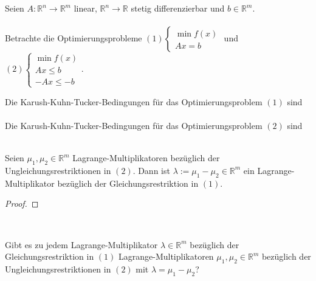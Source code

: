 Seien $A: \mathbb R^n\to \mathbb R^m$ linear, $\mathbb R^n\to \mathbb R$ stetig differenzierbar und $b\in\mathbb R^m$.\\\\
Betrachte die Optimierungsprobleme $(1)\begin{cases}\min f(x)\\Ax=b\end{cases}$ und $(2)\begin{cases}\min f(x)\\Ax\leq b\\-Ax\leq -b\end{cases}$.\newline\newline
\begin{compactenum}[(i)]
\item Die Karush-Kuhn-Tucker-Bedingungen für das Optimierungsproblem $(1)$ sind\\\\
Die Karush-Kuhn-Tucker-Bedingungen für das Optimierungsproblem $(2)$ sind \\\\
\item Seien $\mu_1,\mu_2\in\mathbb R^m$ Lagrange-Multiplikatoren bezüglich der Ungleichungsrestriktionen in $(2)$. Dann ist $\lambda:=\mu_1-\mu_2\in\mathbb R^m$ ein Lagrange-Multiplikator bezüglich der Gleichungsrestriktion in $(1)$.
\begin{proof}
\end{proof}~\newline\newline
\item Gibt es zu jedem Lagrange-Multiplikator $\lambda\in\mathbb R^m$ bezüglich der Gleichungsrestriktion in $(1)$ Lagrange-Multiplikatoren $\mu_1,\mu_2\in\mathbb R^m$ bezüglich der Ungleichungsrestriktionen in $(2)$ mit $\lambda=\mu_1-\mu_2$?
\end{compactenum}